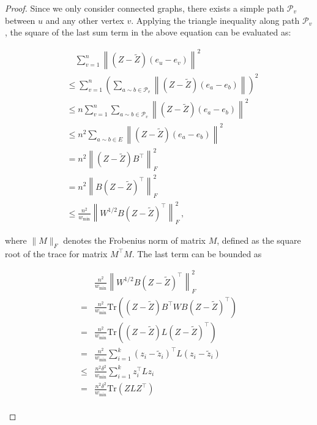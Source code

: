 \documentclass[sigconf]{acmart}
\def\trace#1{\mathrm{Tr} \left(#1 \right)}
\def\norm#1{\left\| #1 \right\|}
\newcommand\ee{\boldsymbol{\mathit{e}}}
\newcommand\zz{\boldsymbol{\mathit{z}}}
\newcommand\BB{\boldsymbol{\mathit{B}}}
\newcommand\MM{\boldsymbol{\mathit{M}}}
\newcommand\LL{\boldsymbol{\mathit{L}}}
\newcommand\WW{\boldsymbol{\mathit{W}}}
\newcommand\ZZtil{\boldsymbol{\mathit{\tilde{Z}}}}
\newcommand\ZZ{\boldsymbol{\mathit{Z}}}
\begin{document}
\begin{proof}
	Since we only consider connected graphs,   there exists a simple path $\mathcal{P}_v$ between $u$ and any other vertex $v$.  Applying the triangle inequality along path $\mathcal{P}_v$, the square of the last sum term in the above equation can be evaluated as:
	\begin{small}
		\begin{align*}
			 & \quad \sum_{v=1}^{n} \norm{(\ZZ-\ZZtil)(\ee_u-\ee_v)}^2                                             \\
			 & \le \sum_{v=1}^{n} \left(\sum_{a\sim b \in \mathcal{P}_v} \norm{(\ZZ-\ZZtil)(\ee_a-\ee_b)}\right)^2 \\
			 & \le n \sum_{v=1}^{n} \sum_{a\sim b \in \mathcal{P}_v} \norm{(\ZZ-\ZZtil)(\ee_a-\ee_b)}^2            \\
			 & \le n^2 \sum_{a\sim b \in E} \norm{(\ZZ-\ZZtil)(\ee_a-\ee_b)}^2                                     \\
			 & = n^2 \norm{(\ZZ - \ZZtil ) \BB^{\top}}_{F}^{2}                                                     \\
			 & = n^2 \norm{\BB(\ZZ - \ZZtil )^{\top}}_{F}^{2}                                                      \\
			 & \leq
			\frac{n^2}{w_{\min}} \norm{\WW^{1/2} \BB(\ZZ - \ZZtil )^{\top}}_{F}^{2}\,,
		\end{align*}
	\end{small}
	where $\| \MM \|_{F}$ denotes the Frobenius norm of  matrix $\MM$,  defined as the square root of the trace for matrix $\MM^{\top} \MM$. The last term can be bounded as
	\begin{small}
		\begin{align*}
			    & \frac{n^2}{w_{\min}} \norm{\WW^{1/2} \BB(\ZZ - \ZZtil )^{\top}}_{F}^{2}                    \\
			=   & \frac{n^2}{w_{\min}} \trace{(\ZZ - \ZZtil )\BB^{\top} \WW \BB(\ZZ - \ZZtil )^{\top}}       \\
			=   & \frac{n^2}{w_{\min}} \trace{(\ZZ - \ZZtil )\LL(\ZZ - \ZZtil )^{\top}}                      \\
			=   & \frac{n^2}{w_{\min}} \sum_{i=1}^k (\zz_i - \tilde{\zz}_i)^\top \LL (\zz_i - \tilde{\zz}_i) \\
			\le & \frac{n^2\delta^2}{w_{\min}} \sum_{i=1}^k \zz_i^\top\LL\zz_i                               \\
			=   & \frac{n^2\delta^2}{w_{\min}}  \trace{\ZZ\LL\ZZ^{\top}}                                     \\

\end{align*}
\end{small}
\end{proof}
\end{document}
